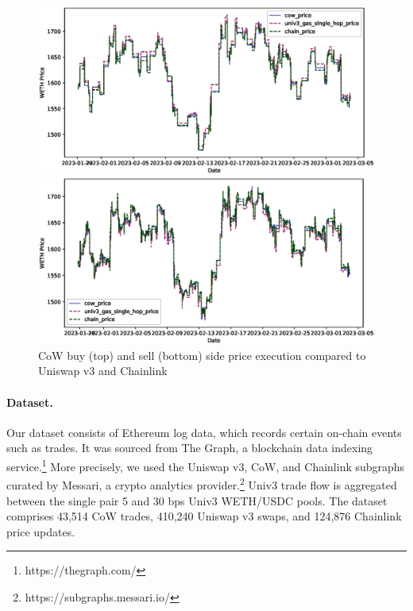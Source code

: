 \documentclass[a4paper,10pt]{article}
\theoremstyle{remark}
\begin{document}
\begin{figure}
  \begin{center}
        \includegraphics[width=.9 \textwidth]
          {diagrams/weth_buy_line.eps}
      \end{center}

      \begin{center}
        \includegraphics[width=.9\textwidth]
          {diagrams/weth_sell_line.eps}
  \end{center}
  \caption{CoW buy (top) and sell (bottom) side price execution compared to Uniswap v3 and Chainlink}
\end{figure}




\paragraph{Dataset.} Our dataset consists of Ethereum log data, which records certain on-chain events such as trades. It was sourced from The Graph, a blockchain data indexing service.\footnote{https://thegraph.com/}
%
More precisely, we used the Uniswap v3, CoW, and Chainlink subgraphs curated by Messari, a crypto analytics provider.\footnote{https://subgraphs.messari.io/}
%
Univ3 trade flow is aggregated between the single pair 5 and 30 bps Univ3 WETH/USDC pools.
%
The dataset comprises 43,514 CoW trades, 410,240 Uniswap v3 swaps, and 124,876 Chainlink price updates. 
\end{document}
